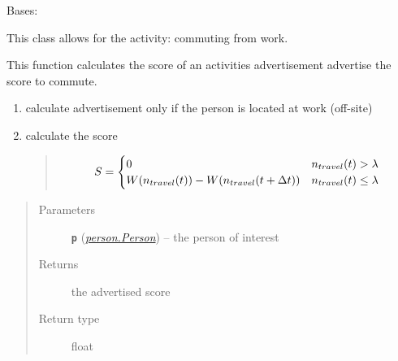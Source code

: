 \documentclass[letterpaper,10pt,english]{sphinxmanual}
\begin{document}
\begin{fulllineitems}
\label{commute:commute.Commute_From_Work}
Bases: {\hyperref[commute:commute.Commute]{\emph{}}}

This class allows for the activity: commuting from work.

\begin{fulllineitems}
\label{commute:commute.Commute_From_Work.advertise}
This function calculates the score of an activities advertisement         advertise the score to commute.
\begin{enumerate}
\item {} 
calculate advertisement only if the person is located at work (off-site)

\item {} 
calculate the score
\begin{quote}
\begin{gather}
\begin{split}S = \begin{cases}
0  & n_{travel}(t) > \lambda \\
W( n_{travel}(t) ) - W( n_{travel}(t + \Delta{t} )) & n_{travel}(t) \le \lambda
\end{cases}\end{split}\notag
\end{gather}\end{quote}

\end{enumerate}
\begin{quote}\begin{description}
\item[{Parameters}] \leavevmode
\textbf{\texttt{p}} ({\hyperref[person:person.Person]{\emph{\emph{person.Person}}}}) -- the person of interest

\item[{Returns}] \leavevmode
the advertised score

\item[{Return type}] \leavevmode
float

\end{description}\end{quote}

\end{fulllineitems}



\end{fulllineitems}
\end{document}

